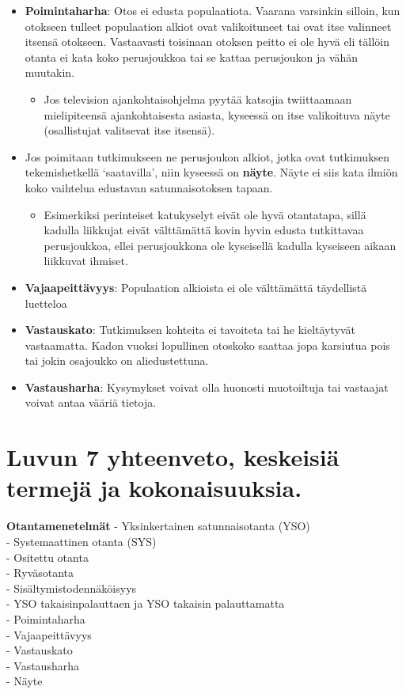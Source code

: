 \documentclass[
]{book}
\providecommand{\tightlist}{%
  \setlength{\itemsep}{0pt}\setlength{\parskip}{0pt}}
\begin{document}
\begin{itemize}
\item
  \textbf{Poimintaharha}: Otos ei edusta populaatiota. Vaarana varsinkin silloin, kun otokseen tulleet populaation alkiot ovat valikoituneet tai ovat itse valinneet itsensä otokseen. Vastaavasti toisinaan otoksen peitto ei ole hyvä eli tällöin otanta ei kata koko perusjoukkoa tai se kattaa perusjoukon ja vähän muutakin.

  \begin{itemize}
  \tightlist
  \item
    Jos television ajankohtaisohjelma pyytää katsojia twiittaamaan mielipiteensä ajankohtaisesta asiasta, kyseessä on itse valikoituva näyte (osallistujat valitsevat itse itsensä).
  \end{itemize}
\item
  Jos poimitaan tutkimukseen ne perusjoukon alkiot, jotka ovat tutkimuksen tekemishetkellä `saatavilla', niin kyseessä on \textbf{näyte}. Näyte ei siis kata ilmiön koko vaihtelua edustavan satunnaisotoksen tapaan.

  \begin{itemize}
  \tightlist
  \item
    Esimerkiksi perinteiset katukyselyt eivät ole hyvä otantatapa, sillä kadulla liikkujat eivät välttämättä kovin hyvin edusta tutkittavaa perusjoukkoa, ellei perusjoukkona ole kyseisellä kadulla kyseiseen aikaan liikkuvat ihmiset.
  \end{itemize}
\item
  \textbf{Vajaapeittävyys}: Populaation alkioista ei ole välttämättä täydellistä luetteloa
\item
  \textbf{Vastauskato}: Tutkimuksen kohteita ei tavoiteta tai he kieltäytyvät vastaamatta. Kadon vuoksi lopullinen otoskoko saattaa jopa karsiutua pois tai jokin osajoukko on aliedustettuna.
\item
  \textbf{Vastausharha}: Kysymykset voivat olla huonosti muotoiltuja tai vastaajat voivat antaa vääriä tietoja.
\end{itemize}

\hypertarget{luvun-7-yhteenveto-keskeisiuxe4-termejuxe4-ja-kokonaisuuksia.}{%
\section{Luvun 7 yhteenveto, keskeisiä termejä ja kokonaisuuksia.}\label{luvun-7-yhteenveto-keskeisiuxe4-termejuxe4-ja-kokonaisuuksia.}}

\textbf{Otantamenetelmät}
- Yksinkertainen satunnaisotanta (YSO)\\
- Systemaattinen otanta (SYS)\\
- Ositettu otanta\\
- Ryväsotanta\\
- Sisältymistodennäköisyys\\
- YSO takaisinpalauttaen ja YSO takaisin palauttamatta\\
- Poimintaharha\\
- Vajaapeittävyys\\
- Vastauskato\\
- Vastausharha\\
- Näyte
\end{document}
